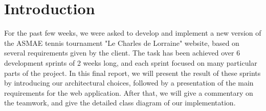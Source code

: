 \section{Introduction}
\label{sec:Introduction}


For the past few weeks, we were asked to develop and implement a new version of the ASMAE tennis tournament "Le Charles de Lorraine" website, based on several requirements given by the client. The task has been achieved over 6 development sprints of 2 weeks long, and each sprint focused on many particular parts of the project. In this final report, we will present the result of these sprints by introducing our architectural choices, followed by a presentation of the main requirements for the web application. After that, we will give a commentary on the teamwork, and give the detailed class diagram of our implementation.  
